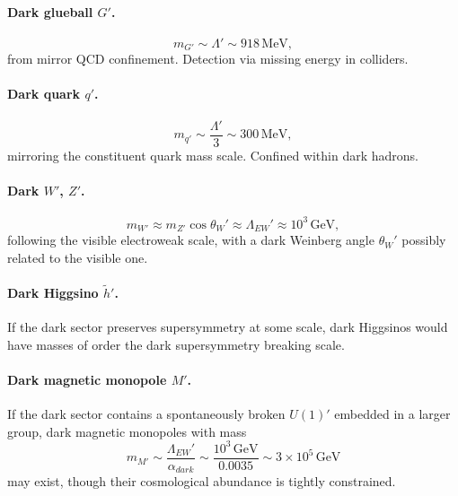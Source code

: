 \documentclass[a4paper,1pt,oneside,openany]{book}
\begin{document}
\paragraph{Dark glueball \texorpdfstring{$G'$}{G'}.}
\begin{equation}
m_{G'}
\sim
\Lambda'
\sim
918\,\text{MeV},
\label{eq:mG'-tier3}
\end{equation}
from mirror QCD confinement. Detection via missing energy in 
colliders.

\paragraph{Dark quark \texorpdfstring{$q'$}{q'}.}
\begin{equation}
m_{q'}
\sim
\frac{\Lambda'}{3}
\sim
300\,\text{MeV},
\label{eq:mq'-tier3}
\end{equation}
mirroring the constituent quark mass scale. Confined within dark 
hadrons.

\paragraph{Dark \texorpdfstring{$W'$}{W'}, \texorpdfstring{$Z'$}{Z'}.}
\begin{equation}
m_{W'}
\approx
m_{Z'}
\cos\theta_{W}'
\approx
\Lambda_{EW}'
\approx
10^{3}\,\text{GeV},
\label{eq:mW'-tier3}
\end{equation}
following the visible electroweak scale, with a dark Weinberg 
angle $\theta_{W}'$ possibly related to the visible one.

\paragraph{Dark Higgsino \texorpdfstring{$\tilde{h}'$}{h'}.}
If the dark sector preserves supersymmetry at some scale, dark 
Higgsinos would have masses of order the dark supersymmetry 
breaking scale.

\paragraph{Dark magnetic monopole \texorpdfstring{$M'$}{M'}.}
If the dark sector contains a spontaneously broken $U(1)'$ 
embedded in a larger group, dark magnetic monopoles with mass
\begin{equation}
m_{M'}
\sim
\frac{\Lambda_{EW}'}{\alpha_{dark}}
\sim
\frac{10^{3}\,\text{GeV}}{0.0035}
\sim
3\times 10^{5}\,\text{GeV}
\label{eq:mM'-tier3}
\end{equation}
may exist, though their cosmological abundance is tightly 
constrained.
\end{document}
